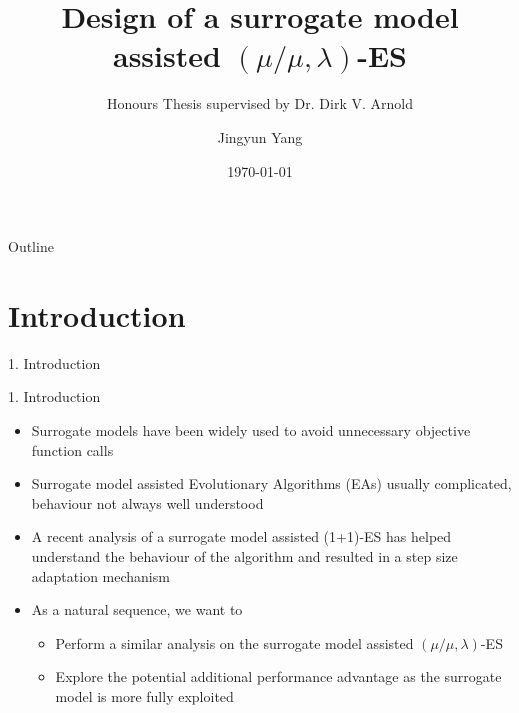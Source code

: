\documentclass{beamer}
\title{Design of a surrogate model assisted $(\mu/\mu,\lambda)$-ES}
\subtitle{Honours Thesis supervised by Dr. Dirk V. Arnold}
\author{Jingyun Yang}
\institute{Faculty of Computer Science\\ Dalhousie University\\ jingyun.yang@dal.ca}
\date{\today}
\begin{document}
\begin{frame}
  \titlepage
\end{frame}


\begin{frame}{Outline}
  \tableofcontents
\end{frame}


\section{Introduction}


\begin{frame}[plain,c]
\begin{center}
\Huge 1. Introduction
\end{center}
\end{frame}


\begin{frame}{1. Introduction}
  \begin{itemize}
    \item Surrogate models have been widely used to avoid unnecessary objective function calls
    \item Surrogate model assisted Evolutionary Algorithms (EAs) usually complicated, behaviour not always well understood
    \item A recent analysis of a surrogate model assisted (1+1)-ES has helped understand the behaviour of the algorithm and resulted in a step size adaptation mechanism   
    \item As a natural sequence, we want to 
    \begin{itemize}
      \item Perform a similar analysis on the surrogate model assisted $(\mu/\mu,\lambda)$-ES
      \item Explore the potential additional performance advantage as the surrogate model is more fully exploited 
      
    \end{itemize}
  \end{itemize}
\end{frame}
\end{document}
